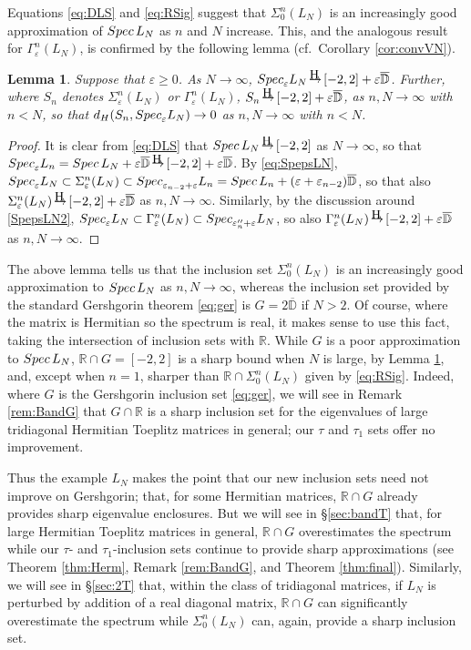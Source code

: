 \documentclass[preprint,1p,11pt]{elsarticle}
\newcommand\D{{\mathbb D}}
\newcommand\R{{\mathbb R}}
\newcommand\eps{{\varepsilon}}
\newcommand\Spec{{\rm Spec}\,}  %
\newcommand\Specn{{\rm Spec}}   %
\newcommand\Speps{{\rm Spec}_\eps}
\newcommand\Hto{
   \unitlength0.1ex
   \begin{picture}(30,15)
   \put(13,16){\makebox(0,0)[]{\tiny\rm H}}
   \put(15,5){\makebox(0,0)[]{$\to$}}
   \end{picture}
}
\newtheorem{lemma}[theorem]{Lemma}
\numberwithin{equation}{section}   %
\numberwithin{figure}{section}  %
\begin{document}
Equations \eqref{eq:DLS} and \eqref{eq:RSig} suggest that $\Sigma^n_0(L_N)$ is an increasingly good approximation of $\Spec L_N$ as $n$ and $N$ increase. This, and the analogous result for $\Gamma^n_\eps(L_N)$, is confirmed by the following lemma (cf.\ Corollary \ref{cor:convVN}).

\begin{lemma} \label{lem:conv}
Suppose that $\eps \geq 0$. As $N\to\infty$, $\Speps L_N\Hto [-2,2]+\eps\overline{\D}$. Further, where $S_n$ denotes  $\Sigma_\eps^n(L_N)$ or $\Gamma_\eps^n(L_N)$,  $S_n\Hto [-2,2]+\eps\overline{\D}$, as $n,N\to\infty$ with $n< N$, so that $d_H(S_n,\Speps L_N)\to 0$ as $n,N\to\infty$ with $n<N$. 
\end{lemma}
\begin{proof} It is clear from \eqref{eq:DLS} that $\Spec L_N \Hto [-2,2]$ as $N\to\infty$, so that $\Speps L_n = \Spec L_N + \eps{\overline \D} \Hto [-2,2]+\eps\overline{\D}$. By \eqref{eq:SpepsLN}, $\Speps L_N \subset \Sigma_\eps^n(L_N) \subset \Specn_{\eps_{n-2}+\eps} L_n = \Spec L_n + (\eps+\eps_{n-2})\overline{\D}$, so that also $\Sigma_\eps^n(L_N)\Hto [-2,2]+\eps\overline{\D}$ as $n,N\to\infty$. Similarly, by the discussion around \eqref{SpepsLN2}, $\Speps L_N \subset \Gamma_\eps^n(L_N) \subset \Specn_{\eps''_n+\eps} L_N$, so also  $\Gamma_\eps^n(L_N)\Hto [-2,2]+\eps\overline{\D}$ as $n,N\to\infty$.
\end{proof}

The above lemma tells us that the inclusion set $\Sigma^n_0(L_N)$ is an increasingly good approximation to $\Spec L_N$ as $n,N\to\infty$, whereas the inclusion set provided by the standard Gershgorin theorem \eqref{eq:ger} is $G=2\overline{\D}$ if $N>2$. Of course, where the matrix is Hermitian so the spectrum is real, it makes sense to use this fact, taking the intersection of inclusion sets with $\R$. While $G$ is a poor approximation to $\Spec L_N$, $\R\cap G = [-2,2]$  is a sharp bound when $N$ is large, by  Lemma \ref{lem:conv}, and, except when $n=1$, sharper than $\R\cap\Sigma_0^n(L_N)$ given by \eqref{eq:RSig}.  Indeed, where $G$ is the Gershgorin inclusion set \eqref{eq:ger}, we will see in Remark \ref{rem:BandG} that $G\cap\R$ is a sharp inclusion set for the eigenvalues of large tridiagonal Hermitian Toeplitz matrices in general; our $\tau$ and $\tau_1$ sets offer no improvement.

Thus the example $L_N$ makes the point that our new inclusion sets need not improve on Gershgorin; that, for some Hermitian matrices, $\R\cap G$ already provides sharp eigenvalue enclosures. But we will see in \S\ref{sec:bandT} that, for large Hermitian Toeplitz matrices in general, $\R\cap G$ overestimates the spectrum while our $\tau$- and $\tau_1$-inclusion sets continue to provide sharp approximations (see Theorem \ref{thm:Herm}, Remark \ref{rem:BandG}, and Theorem \ref{thm:final}). Similarly, we will see  in \S\ref{sec:2T} that, within the class of  tridiagonal matrices, if $L_N$ is perturbed by addition of a real diagonal matrix, $\R\cap G$ can significantly overestimate the spectrum while $\Sigma_0^n(L_N)$ can, again, provide a sharp inclusion set.
\end{document}
